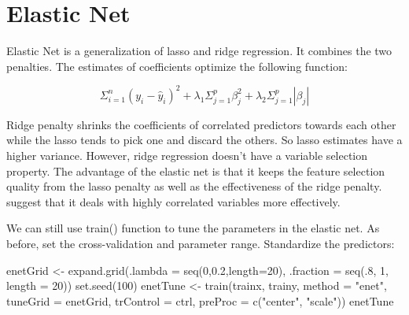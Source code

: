 \documentclass[
  12pt,
]{krantz}
\makeatletter
\newenvironment{Shaded}{\begin{snugshade}}{\end{snugshade}}
\newcommand{\AttributeTok}[1]{\textcolor[rgb]{0.61,0.61,0.61}{#1}}
\newcommand{\DecValTok}[1]{\textcolor[rgb]{0.06,0.06,0.06}{#1}}
\newcommand{\FloatTok}[1]{\textcolor[rgb]{0.06,0.06,0.06}{#1}}
\newcommand{\FunctionTok}[1]{\textcolor[rgb]{0,0,0}{#1}}
\newcommand{\NormalTok}[1]{#1}
\newcommand{\OtherTok}[1]{\textcolor[rgb]{0.37,0.37,0.37}{#1}}
\newcommand{\StringTok}[1]{\textcolor[rgb]{0.5,0.5,0.5}{#1}}
\newenvironment{kframe}{%
\medskip{}
\setlength{\fboxsep}{.8em}
 \def\at@end@of@kframe{}%
 \ifinner\ifhmode%
  \def\at@end@of@kframe{\end{minipage}}%
  \begin{minipage}{\columnwidth}%
 \fi\fi%
 \def\FrameCommand##1{\hskip\@totalleftmargin \hskip-\fboxsep
 \colorbox{shadecolor}{##1}\hskip-\fboxsep
     \hskip-\linewidth \hskip-\@totalleftmargin \hskip\columnwidth}%
 \MakeFramed {\advance\hsize-\width
   \@totalleftmargin\z@ \linewidth\hsize
   \@setminipage}}%
 {\par\unskip\endMakeFramed%
 \at@end@of@kframe}
\renewenvironment{Shaded}{\begin{kframe}}{\end{kframe}}
\makeatother
\begin{document}
\hypertarget{elastic-net}{%
\section{Elastic Net}\label{elastic-net}}

Elastic Net is a generalization of lasso and ridge regression\citep{zou2005}. It combines the two penalties. The estimates of coefficients optimize the following function:

\begin{equation}
\Sigma_{i=1}^{n}(y_{i}-\hat{y}_{i})^{2}+\lambda_{1}\Sigma_{j=1}^{p}\beta_{j}^{2}+\lambda_{2}\Sigma_{j=1}^{p}|\beta_{j}|
\label{eq:elasticnet}
\end{equation}

Ridge penalty shrinks the coefficients of correlated predictors towards each other while the lasso tends to pick one and discard the others. So lasso estimates have a higher variance. However, ridge regression doesn't have a variable selection property. The advantage of the elastic net is that it keeps the feature selection quality from the lasso penalty as well as the effectiveness of the ridge penalty. \citep{zou2005} suggest that it deals with highly correlated variables more effectively.

We can still use train() function to tune the parameters in the elastic net. As before, set the cross-validation and parameter range. Standardize the predictors:

\begin{Shaded}
\begin{Highlighting}[]
\NormalTok{enetGrid }\OtherTok{\textless{}{-}} \FunctionTok{expand.grid}\NormalTok{(}\AttributeTok{.lambda =} \FunctionTok{seq}\NormalTok{(}\DecValTok{0}\NormalTok{,}\FloatTok{0.2}\NormalTok{,}\AttributeTok{length=}\DecValTok{20}\NormalTok{), }
                        \AttributeTok{.fraction =} \FunctionTok{seq}\NormalTok{(.}\DecValTok{8}\NormalTok{, }\DecValTok{1}\NormalTok{, }\AttributeTok{length =} \DecValTok{20}\NormalTok{))}
\FunctionTok{set.seed}\NormalTok{(}\DecValTok{100}\NormalTok{)}
\NormalTok{enetTune }\OtherTok{\textless{}{-}} \FunctionTok{train}\NormalTok{(trainx, trainy,}
                  \AttributeTok{method =} \StringTok{"enet"}\NormalTok{,}
                  \AttributeTok{tuneGrid =}\NormalTok{ enetGrid,}
                  \AttributeTok{trControl =}\NormalTok{ ctrl,}
                  \AttributeTok{preProc =} \FunctionTok{c}\NormalTok{(}\StringTok{"center"}\NormalTok{, }\StringTok{"scale"}\NormalTok{))}
\NormalTok{enetTune}
\end{Highlighting}
\end{Shaded}
\end{document}
